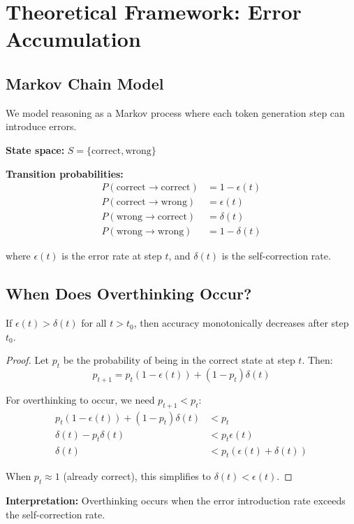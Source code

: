 \section{Theoretical Framework: Error Accumulation}

\subsection{Markov Chain Model}

We model reasoning as a Markov process where each token generation step can introduce errors.

\textbf{State space:} $S = \{\text{correct}, \text{wrong}\}$

\textbf{Transition probabilities:}
\begin{align}
P(\text{correct} \to \text{correct}) &= 1 - \epsilon(t) \\
P(\text{correct} \to \text{wrong}) &= \epsilon(t) \\
P(\text{wrong} \to \text{correct}) &= \delta(t) \\
P(\text{wrong} \to \text{wrong}) &= 1 - \delta(t)
\end{align}

where $\epsilon(t)$ is the error rate at step $t$, and $\delta(t)$ is the self-correction rate.

\subsection{When Does Overthinking Occur?}

\begin{theorem}
If $\epsilon(t) > \delta(t)$ for all $t > t_0$, then accuracy monotonically decreases after step $t_0$.
\end{theorem}

\begin{proof}
Let $p_t$ be the probability of being in the correct state at step $t$.
Then:
$$p_{t+1} = p_t(1-\epsilon(t)) + (1-p_t)\delta(t)$$

For overthinking to occur, we need $p_{t+1} < p_t$:
\begin{align}
p_t(1-\epsilon(t)) + (1-p_t)\delta(t) &< p_t \\
\delta(t) - p_t\delta(t) &< p_t\epsilon(t) \\
\delta(t) &< p_t(\epsilon(t) + \delta(t))
\end{align}

When $p_t \approx 1$ (already correct), this simplifies to $\delta(t) < \epsilon(t)$.
\end{proof}

\textbf{Interpretation:} Overthinking occurs when the error introduction rate exceeds the self-correction rate.
